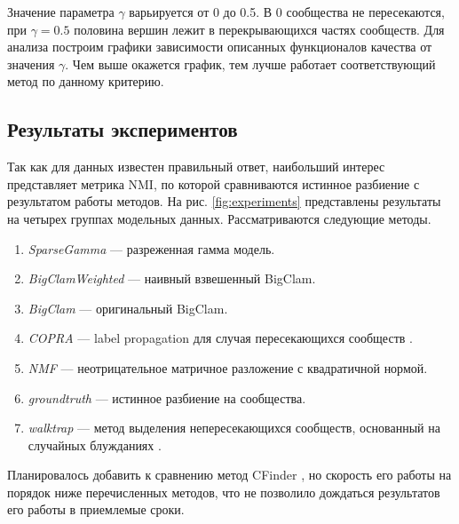 \documentclass{ITaSconf}
\begin{document}
	Значение параметра $\gamma$ варьируется от 0 до 0.5. 
	В 0 сообщества не пересекаются, при $\gamma=0.5$ половина вершин лежит в перекрывающихся частях сообществ.
	Для анализа построим графики зависимости описанных функционалов качества от значения $\gamma$. 
	Чем выше окажется график, тем лучше работает соответствующий метод по данному критерию.
	
	\subsection{Результаты экспериментов}
	
	Так как для данных известен правильный ответ, наибольший интерес представляет метрика NMI, по которой сравниваются истинное разбиение с результатом работы методов. На рис. \ref{fig:experiments} представлены результаты на четырех группах модельных данных.
	Рассматриваются следующие методы.
	
	\begin{enumerate}
		\item \textit{SparseGamma} --- разреженная гамма модель.
		\item \textit{BigClamWeighted} --- наивный взвешенный BigClam.
		\item \textit{BigClam} --- оригинальный BigClam.
		\item \textit{COPRA} --- label propagation для случая пересекающихся сообществ \cite{gregory2010finding}.
		\item \textit{NMF} --- неотрицательное матричное разложение с квадратичной нормой.
		\item \textit{groundtruth} --- истинное разбиение на сообщества.
		\item \textit{walktrap} --- метод выделения непересекающихся сообществ, основанный на случайных блужданиях \cite{Pascal05}.
	\end{enumerate}
	Планировалось добавить к сравнению метод CFinder \cite{palla2005uncovering}, но скорость его работы на порядок ниже перечисленных методов, что не позволило дождаться результатов его работы в приемлемые сроки.
	
\end{document}
